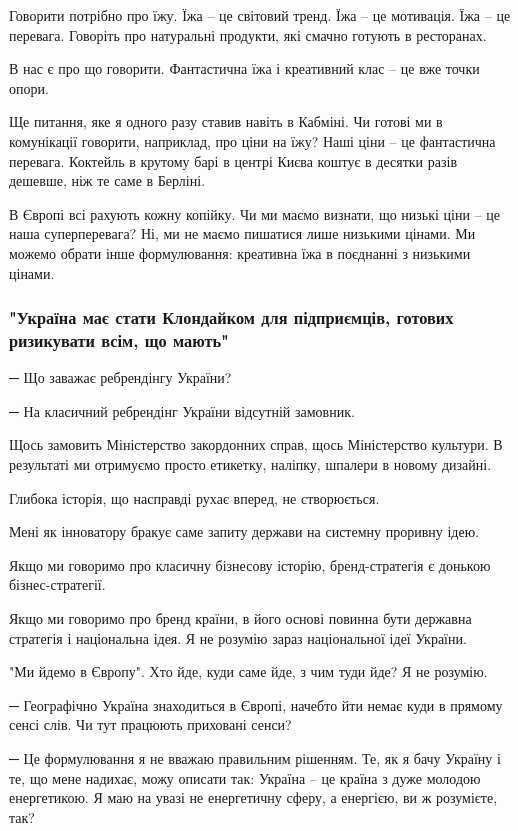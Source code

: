 Говорити потрібно про їжу. Їжа – це світовий тренд. Їжа – це мотивація. Їжа –
це перевага. Говоріть про натуральні продукти, які смачно готують в ресторанах. 

В нас є про що говорити. Фантастична їжа і креативний клас – це вже точки
опори.

Ще питання, яке я одного разу ставив навіть в Кабміні. Чи готові ми в
комунікації говорити, наприклад, про ціни на їжу? Наші ціни – це фантастична
перевага. Коктейль в крутому барі в центрі Києва коштує в десятки разів
дешевше, ніж те саме в Берліні.

В Європі всі рахують кожну копійку. Чи ми маємо визнати, що низькі ціни – це
наша суперперевага? Ні, ми не маємо пишатися лише низькими цінами. Ми можемо
обрати інше формулювання: креативна їжа в поєднанні з низькими цінами.

\subsubsection{"Україна має стати Клондайком для підприємців, готових ризикувати всім, що мають"}

─ Що заважає ребрендінгу України?

─ На класичний ребрендінг України відсутній замовник.

Щось замовить Міністерство закордонних справ, щось Міністерство культури. В
результаті ми отримуємо просто етикетку, наліпку, шпалери в новому дизайні.

Глибока історія, що насправді рухає вперед, не створюється.

Мені як інноватору бракує саме запиту держави на системну проривну ідею.

Якщо ми говоримо про класичну бізнесову історію, бренд-стратегія є донькою
бізнес-стратегії. 

Якщо ми говоримо про бренд країни, в його основі повинна бути державна
стратегія і національна ідея. Я не розумію зараз національної ідеї України.

"Ми йдемо в Європу". Хто йде, куди саме йде, з чим туди йде? Я не розумію.

─ Географічно Україна знаходиться в Європі, начебто йти немає куди в прямому
сенсі слів. Чи тут працюють приховані сенси?

─ Це формулювання я не вважаю правильним рішенням. Те, як я бачу Україну і те,
що мене надихає, можу описати так: Україна – це країна з дуже молодою
енергетикою. Я маю на увазі не енергетичну сферу, а енергією, ви ж розумієте,
так? 

